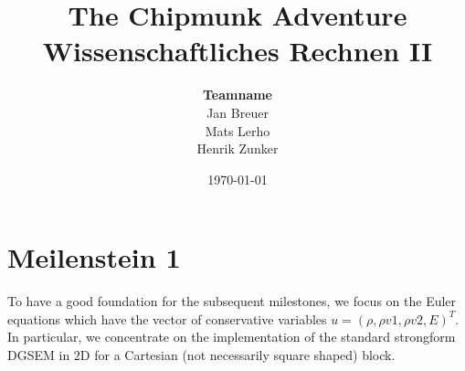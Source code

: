 \documentclass[11pt]{scrartcl}
\begin{document}


\title{{\Huge The Chipmunk Adventure} \\[18pt]
Wissenschaftliches Rechnen II \\[18pt]}
\author{ \textbf{Teamname} \\
Jan Breuer\\
Mats Lerho \\
Henrik Zunker}
\date{\today}

\maketitle


\thispagestyle{empty}


% 

\newpage
\tableofcontents
\thispagestyle{empty}
\newpage

\section{Meilenstein 1}
To have a good foundation for the subsequent milestones, we focus on the Euler equations which have the vector of conservative variables $u=(\rho, \rho v1, \rho v2, E)^T$. In particular, we concentrate on the implementation of the standard strongform DGSEM in $2$D for a Cartesian (not necessarily square shaped) block.
\end{document}
